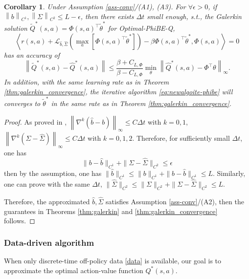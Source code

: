 \documentclass[12pt]{article}
\newtheorem{corollary}{Corollary}
\def\e{\epsilon}
\def\th{\theta}
\def\th{\theta}
\def\l{\left}
\def\r{\right}
\def\la{\left\langle}
\def\ra{\right\rangle}
\def\ll{\left\lVert}
\def\rl{\right\rVert}
\def\nb{\nabla}
\def\t{\tilde}
\def\dt{{\Delta t}}
\begin{document}
\begin{corollary}
Under Assumption \ref{ass-conv}/(A1), (A3). For $\forall \epsilon>0$, if $\ll b \rl_{C^1}, \ll \Sigma \rl_{C^2} \leq L-\epsilon$, then there exists $\dt$ small enough, s.t., the Galerkin solution $\t{Q}^*(s,a) = \Phi(s,a)^\top\t{\th}^*$ for Optimal-PhiBE-Q,
\begin{equation}\label{galerkin-solu-phibe}
    \la r(s,a) + \mathcal{L}_{\hat{b},\hat{\Sigma}}  \l(\max_a \l[\Phi(s,a)^\top \t{\th}^*\r]\r)  - \beta\Phi(s,a)^\top\t{\th}^*,\Phi(s,a)\ra= 0
\end{equation}
has an accuracy of 
\[
\ll \t{Q}^*(s,a) - \hat{Q}^*(s,a) \rl \leq \frac{\beta + C_{L,\Phi}}{\beta - C_{L,\Phi}}\min_\th \ll \hat{Q}^*(s,a) - \Phi^\top \th \rl_\infty.
\]
In addition, with the same learning rate as in Theorem \ref{thm:galerkin_convergence}, the iterative algorithm \eqref{eq:newalgoite-phibe} will converges to $\t{\th}^*$ in the same rate as in Theorem \ref{thm:galerkin_convergence}.
\end{corollary}
\begin{proof}
As proved in \citep{zhu2025optimal}, $\ll \nb^k(\hat{b} - b) \rl_\infty \leq C\dt$ with $k = 0,1$, $\ll \nb^k(\Sigma - \hat{\Sigma})\rl_\infty \leq C\dt$ with $k = 0,1,2$. Therefore, for sufficiently small $\dt$, one has 
\[
\|b - \hat{b}\|_{C^1} +\| \Sigma - \hat{\Sigma}\|_{C^2} \leq \e
\]
then by the assumption, one has
$\|\hat{b}\|_{C^1} \leq \|b\|_{C^1} + \|b - \hat{b}\|_{C^1}  \leq L.$ Similarly, one can prove with the same $\dt$, $\|\hat{\Sigma}\|_{C^2} \leq \|\Sigma\|_{C^2} + \| \Sigma - \hat{\Sigma}\|_{C^2}  \leq L.$

Therefore, the approximated $\hat{b}, \hat{\Sigma}$ satisfies Assumption \ref{ass-conv}/(A2), then the guarantees in Theorems \ref{thm:galerkin} and \ref{thm:galerkin_convergence} follows. 

\end{proof}

\subsubsection{Data-driven algorithm}\label{sec:4.2.2}
When only discrete-time off-policy data \eqref{data} is available, our goal is to approximate the optimal action-value function $Q^*(s,a)$. 
\end{document}
